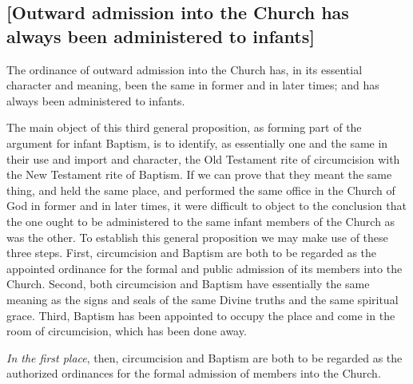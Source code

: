 \documentclass[
  english,
]{book}
\begin{document}
\hypertarget{outward-admission-into-the-church-has-always-been-administered-to-infants}{%
\subsection{{[}Outward admission into the Church has always been administered to infants{]}}\label{outward-admission-into-the-church-has-always-been-administered-to-infants}}

The ordinance of outward admission into the Church has, in its essential character and meaning, been the same in former and in later times; and has always been administered to infants.

The main object of this third general proposition, as forming part of the argument for infant Baptism, is to identify, as essentially one and the same in their use and import and character, the Old Testament rite of circumcision with the New Testament rite of Baptism. If we can prove that they meant the same thing, and held the same place, and performed the same office in the Church of God in former and in later times, it were difficult to object to the conclusion that the one ought to be administered to the same infant members of the Church as was the other. To establish this general proposition we may make use of these three steps. First, circumcision and Baptism are both to be regarded as the appointed ordinance for the formal and public admission of its members into the Church. Second, both circumcision and Baptism have essentially the same meaning as the signs and seals of the same Divine truths and the same spiritual grace. Third, Baptism has been appointed to occupy the place and come in the room of circumcision, which has been done away.

\emph{In the first place}, then, circumcision and Baptism are both to be regarded as the authorized ordinances for the formal admission of members into the Church.
\end{document}
